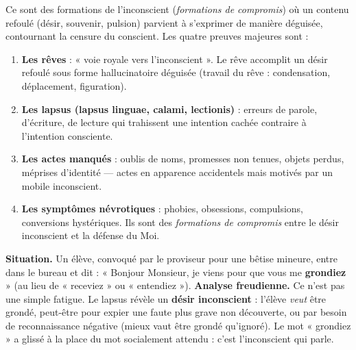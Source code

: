 \documentclass[11pt]{article}
\begin{document}
\begin{definition}
Ce sont des formations de l'inconscient (\emph{formations de compromis}) où un contenu refoulé (désir, souvenir, pulsion) parvient à s'exprimer de manière déguisée, contournant la censure du conscient. Les quatre preuves majeures sont :
\begin{enumerate}
    \item \textbf{Les rêves} : « voie royale vers l'inconscient ». Le rêve accomplit un désir refoulé sous forme hallucinatoire déguisée (travail du rêve : condensation, déplacement, figuration).
    \item \textbf{Les lapsus (lapsus linguae, calami, lectionis)} : erreurs de parole, d'écriture, de lecture qui trahissent une intention cachée contraire à l'intention consciente.
    \item \textbf{Les actes manqués} : oublis de noms, promesses non tenues, objets perdus, méprises d'identité — actes en apparence accidentels mais motivés par un mobile inconscient.
    \item \textbf{Les symptômes névrotiques} : phobies, obsessions, compulsions, conversions hystériques. Ils sont des \emph{formations de compromis} entre le désir inconscient et la défense du Moi.
\end{enumerate}
\end{definition}

\begin{exemplebox}
\textbf{Situation.} Un élève, convoqué par le proviseur pour une bêtise mineure, entre dans le bureau et dit : « Bonjour Monsieur, je viens pour que vous me \textbf{grondiez} » (au lieu de « receviez » ou « entendiez »).
\textbf{Analyse freudienne.} Ce n'est pas une simple fatigue. Le lapsus révèle un \textbf{désir inconscient} : l'élève \emph{veut} être grondé, peut-être pour expier une faute plus grave non découverte, ou par besoin de reconnaissance négative (mieux vaut être grondé qu'ignoré). Le mot « grondiez » a glissé à la place du mot socialement attendu : c'est l'inconscient qui parle.
\end{exemplebox}
\end{document}
